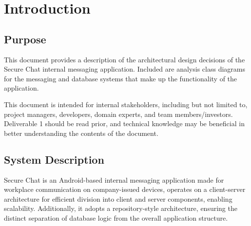 \documentclass[]{article}
\begin{document}
\newpage
\section{Introduction}
\label{sec:introduction}


\subsection{Purpose}
\label{sub:purpose}
This document provides a description of the architectural design decisions of the Secure Chat internal messaging application. Included are analysis class diagrams for the messaging and database systems that make up the functionality of the application. 

This document is intended for internal stakeholders, including but not limited to, project managers, developers, domain experts, and team members/investors. Deliverable 1 should be read prior, and technical knowledge may be beneficial in better understanding the contents of the document. 

\subsection{System Description}
\label{sub:system_description}
Secure Chat is an Android-based internal messaging application made for workplace communication on company-issued devices, operates on a client-server architecture for efficient division into client and server components, enabling scalability. Additionally, it adopts a repository-style architecture, ensuring the distinct separation of database logic from the overall application structure.
\end{document}
